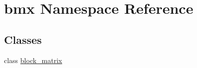 \hypertarget{namespacebmx}{}\section{bmx Namespace Reference}
\label{namespacebmx}
\subsection*{Classes}
\begin{DoxyCompactItemize}
\item 
class \mbox{\hyperlink{classbmx_1_1block__matrix}{block\+\_\+matrix}}
\end{DoxyCompactItemize}
